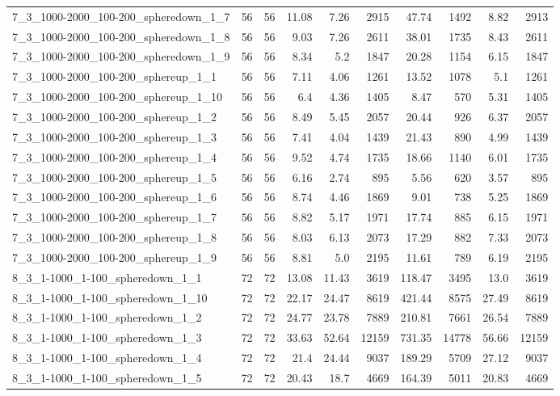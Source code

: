 \begin{center}
\begin{scriptsize}
\begin{longtable}{lrrrrrrrrr}
7\_3\_1000-2000\_100-200\_spheredown\_1\_7 & 56 & 56 & 11.08 & 7.26 & 2915 & 47.74 & 1492 & 8.82 & 2913\\
7\_3\_1000-2000\_100-200\_spheredown\_1\_8 & 56 & 56 & 9.03 & 7.26 & 2611 & 38.01 & 1735 & 8.43 & 2611\\
7\_3\_1000-2000\_100-200\_spheredown\_1\_9 & 56 & 56 & 8.34 & 5.2 & 1847 & 20.28 & 1154 & 6.15 & 1847\\
7\_3\_1000-2000\_100-200\_sphereup\_1\_1 & 56 & 56 & 7.11 & 4.06 & 1261 & 13.52 & 1078 & 5.1 & 1261\\
7\_3\_1000-2000\_100-200\_sphereup\_1\_10 & 56 & 56 & 6.4 & 4.36 & 1405 & 8.47 & 570 & 5.31 & 1405\\
7\_3\_1000-2000\_100-200\_sphereup\_1\_2 & 56 & 56 & 8.49 & 5.45 & 2057 & 20.44 & 926 & 6.37 & 2057\\
7\_3\_1000-2000\_100-200\_sphereup\_1\_3 & 56 & 56 & 7.41 & 4.04 & 1439 & 21.43 & 890 & 4.99 & 1439\\
7\_3\_1000-2000\_100-200\_sphereup\_1\_4 & 56 & 56 & 9.52 & 4.74 & 1735 & 18.66 & 1140 & 6.01 & 1735\\
7\_3\_1000-2000\_100-200\_sphereup\_1\_5 & 56 & 56 & 6.16 & 2.74 & 895 & 5.56 & 620 & 3.57 & 895\\
7\_3\_1000-2000\_100-200\_sphereup\_1\_6 & 56 & 56 & 8.74 & 4.46 & 1869 & 9.01 & 738 & 5.25 & 1869\\
7\_3\_1000-2000\_100-200\_sphereup\_1\_7 & 56 & 56 & 8.82 & 5.17 & 1971 & 17.74 & 885 & 6.15 & 1971\\
7\_3\_1000-2000\_100-200\_sphereup\_1\_8 & 56 & 56 & 8.03 & 6.13 & 2073 & 17.29 & 882 & 7.33 & 2073\\
7\_3\_1000-2000\_100-200\_sphereup\_1\_9 & 56 & 56 & 8.81 & 5.0 & 2195 & 11.61 & 789 & 6.19 & 2195\\
8\_3\_1-1000\_1-100\_spheredown\_1\_1 & 72 & 72 & 13.08 & 11.43 & 3619 & 118.47 & 3495 & 13.0 & 3619\\
8\_3\_1-1000\_1-100\_spheredown\_1\_10 & 72 & 72 & 22.17 & 24.47 & 8619 & 421.44 & 8575 & 27.49 & 8619\\
8\_3\_1-1000\_1-100\_spheredown\_1\_2 & 72 & 72 & 24.77 & 23.78 & 7889 & 210.81 & 7661 & 26.54 & 7889\\
8\_3\_1-1000\_1-100\_spheredown\_1\_3 & 72 & 72 & 33.63 & 52.64 & 12159 & 731.35 & 14778 & 56.66 & 12159\\
8\_3\_1-1000\_1-100\_spheredown\_1\_4 & 72 & 72 & 21.4 & 24.44 & 9037 & 189.29 & 5709 & 27.12 & 9037\\
8\_3\_1-1000\_1-100\_spheredown\_1\_5 & 72 & 72 & 20.43 & 18.7 & 4669 & 164.39 & 5011 & 20.83 & 4669\\

\end{longtable}
\end{scriptsize}
\end{center}
